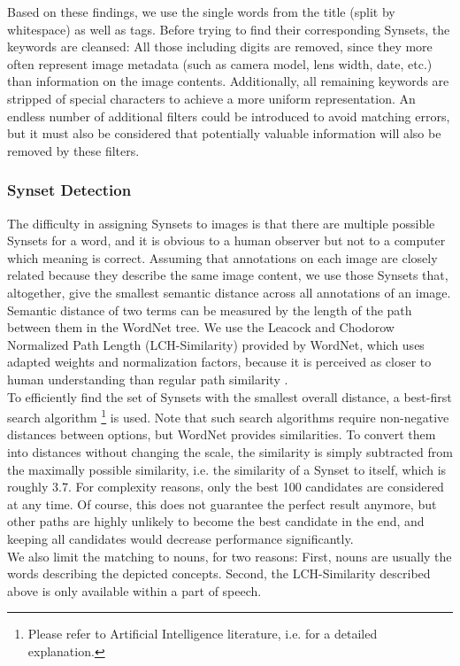 Based on these findings, we use the single words from the title (split by whitespace) as well as tags. Before trying to find their corresponding Synsets, the keywords are cleansed: All those including digits are removed, since they more often represent image metadata (such as camera model, lens width, date, etc.) than information on the image contents. Additionally, all remaining keywords are stripped of special characters to achieve a more uniform representation. An endless number of additional filters could be introduced to avoid matching errors, but it must also be considered that potentially valuable information will also be removed by these filters.\\

\subsubsection{Synset Detection}
\label{sec_synsetdetection}
The difficulty in assigning Synsets to images is that there are multiple possible Synsets for a word, and it is obvious to a human observer but not to a computer which meaning is correct. Assuming that annotations on each image are closely related because they describe the same image content, we use those Synsets that, altogether, give the smallest semantic distance across all annotations of an image. Semantic distance of two terms can be measured by the length of the path between them in the WordNet tree. We use the Leacock and Chodorow Normalized Path Length (LCH-Similarity) provided by WordNet, which uses adapted weights and normalization factors, because it is perceived as closer to human understanding than regular path similarity \cite{budanitsky01}. \\

To efficiently find the set of Synsets with the smallest overall distance, a best-first search algorithm \footnote{Please refer to Artificial Intelligence literature, i.e. \cite{kumar2008} for a detailed explanation.} is used. Note that such search algorithms require non-negative distances between options, but WordNet provides similarities. To convert them into distances without changing the scale, the similarity is simply subtracted from the maximally possible similarity, i.e. the similarity of a Synset to itself, which is roughly 3.7.
For complexity reasons, only the best 100 candidates are considered at any time. Of course, this does not guarantee the perfect result anymore, but other paths are highly unlikely to become the best candidate in the end, and keeping all candidates would decrease performance significantly. \\
We also limit the matching to nouns, for two reasons: First, nouns are usually the words describing the depicted concepts. Second, the LCH-Similarity described above is only available within a part of speech. 


